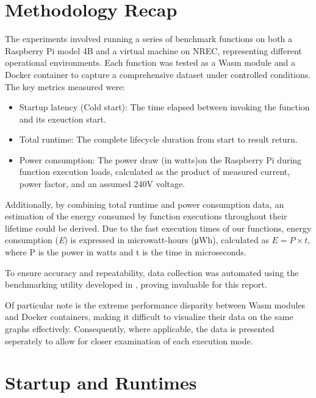 \documentclass[
  table]{report}
\providecommand{\tightlist}{%
  \setlength{\itemsep}{0pt}\setlength{\parskip}{0pt}}
\begin{document}
\section{Methodology Recap}

The experiments involved running a series of benchmark functions on both
a Raspberry Pi model 4B and a virtual machine on \ac{NREC}, representing
different operational environments. Each function was tested as a
\ac{Wasm} module and a Docker container to capture a comprehensive
dataset under controlled conditions. The key metrics measured were:

\begin{itemize}
\tightlist
\item
  Startup latency (Cold start): The time elapsed between invoking the
  function and its exeuction start.
\item
  Total runtime: The complete lifecycle duration from start to result
  return.
\item
  Power consumption: The power draw (in watts)on the Raspberry Pi during
  function execution loads, calculated as the product of measured
  current, power factor, and an assumed 240V voltage.
\end{itemize}

Additionally, by combining total runtime and power consumption data, an
estimation of the energy consumed by function executions throughout
their lifetime could be derived. Due to the fast execution times of our
functions, energy consumption (\emph{E}) is expressed in microwatt-hours
(μWh), calculated as \(E = P
\times t\), where P is the power in watts and t is the time in
microseconds.

To ensure accuracy and repeatability, data collection was automated
using the benchmarking utility developed in ,
proving invaluable for this report.

Of particular note is the extreme performance disparity between
\ac{Wasm} modules and Docker containers, making it difficult to
visualize their data on the same graphs effectively. Consequently, where
applicable, the data is presented seperately to allow for closer
examination of each execution mode.

\section{Startup and Runtimes}
\end{document}
